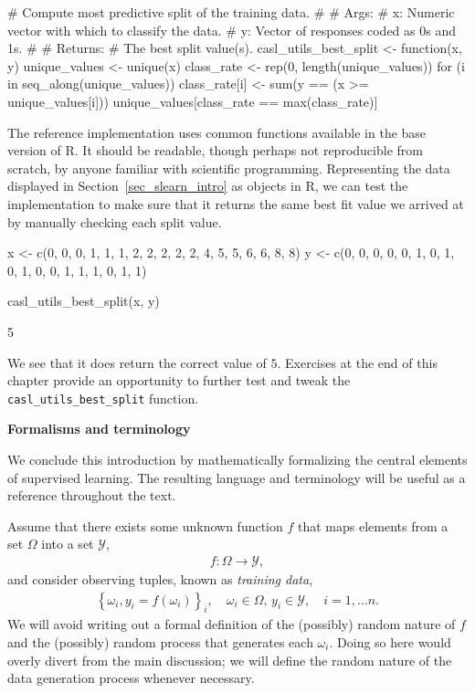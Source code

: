 \documentclass[12pt,hidelinks]{article}
\newcommand{\code}[1]{\texttt{#1}}
\numberwithin{equation}{section}
\begin{document}
\begin{rcode}
# Compute most predictive split of the training data.
#
# Args:
#     x: Numeric vector with which to classify the data.
#     y: Vector of responses coded as 0s and 1s.
#
# Returns:
#     The best split value(s).
casl_utils_best_split <-
function(x, y)
{
  unique_values <- unique(x)
  class_rate <- rep(0, length(unique_values))
  for (i in seq_along(unique_values))
  {
    class_rate[i] <- sum(y == (x >= unique_values[i]))
  }
  unique_values[class_rate == max(class_rate)]
}
\end{rcode}

The reference implementation uses common functions available in the base
version of R. It should be readable, though perhaps not reproducible from
scratch, by anyone familiar with scientific programming. Representing the data
displayed in Section~\ref{sec_slearn_intro} as objects in R, we can test the
implementation to make sure that it returns the same best fit value we arrived
at by manually checking each split value.

\begin{rcode}
x <- c(0, 0, 0, 1, 1, 1, 2, 2, 2, 2, 2, 4, 5, 5, 6, 6, 8, 8)
y <- c(0, 0, 0, 0, 0, 1, 0, 1, 0, 1, 0, 0, 1, 1, 1, 0, 1, 1)

casl_utils_best_split(x, y)
\end{rcode}
\begin{rres}
[1] 5
\end{rres}

We see that it does return the correct value of $5$. Exercises at the
end of this chapter provide an opportunity to further test and tweak the
\code{casl\_utils\_best\_split} function.

\vspace{12pt}
\textbf{Formalisms and terminology}

We conclude this introduction by mathematically formalizing the central
elements of supervised learning. The resulting language and terminology will
be useful as a reference throughout the text.

Assume that there exists some unknown function $f$ that maps
elements from a set $\Omega$ into a set $\mathcal{Y}$,
\begin{align}
f: \Omega \rightarrow \mathcal{Y}, \label{abstract_slearn}
\end{align}
and consider observing tuples, known as \textit{training data},
\begin{align}
\left\{ \omega_i, y_i = f(\omega_i) \right\}_{i},
\quad \omega_i \in \Omega, \, y_i \in \mathcal{Y},
\quad i = 1, \ldots n.
\end{align}
We will avoid writing out a formal definition of the (possibly) random nature
of $f$ and the (possibly) random process that generates each $\omega_i$.
Doing so here would overly divert from the main discussion; we will define the
random nature of the data generation process whenever necessary.
\end{document}
